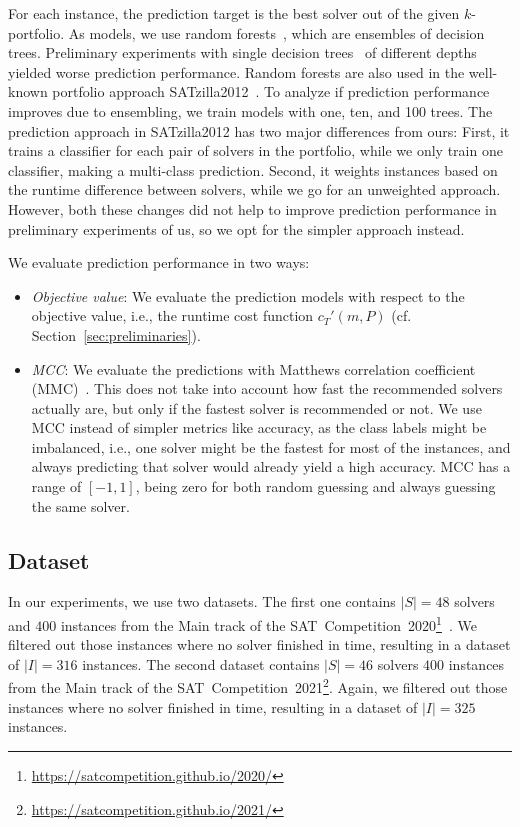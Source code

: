 \documentclass[conference]{IEEEtran}
\begin{document}
For each instance, the prediction target is the best solver out of the given $k$-portfolio.
As models, we use random forests~\cite{breiman2001random}, which are ensembles of decision trees. 
Preliminary experiments with single decision trees~\cite{breiman1984classification} of different depths yielded worse prediction performance. 
Random forests are also used in the well-known portfolio approach SATzilla2012~\cite{xu2012satzilla2012}. 
To analyze if prediction performance improves due to ensembling, we train models with one, ten, and 100 trees.
The prediction approach in SATzilla2012 has two major differences from ours:
First, it trains a classifier for each pair of solvers in the portfolio, while we only train one classifier, making a multi-class prediction.
Second, it weights instances based on the runtime difference between solvers, while we go for an unweighted approach.
However, both these changes did not help to improve prediction performance in preliminary experiments of us, so we opt for the simpler approach instead.

We evaluate prediction performance in two ways:

\begin{itemize}
	\item \emph{Objective value}:
	We evaluate the prediction models with respect to the objective value, i.e., the runtime cost function $c_{T}'(m,P)$ (cf. Section~\ref{sec:preliminaries}). 
	\item \emph{MCC}:
	We evaluate the predictions with Matthews correlation coefficient (MMC)~\cite{matthews1975comparison, gorodkin2004comparing}.
	This does not take into account how fast the recommended solvers actually are, but only if the fastest solver is recommended or not.
	We use MCC instead of simpler metrics like accuracy, as the class labels might be imbalanced, i.e., one solver might be the fastest for most of the instances, and always predicting that solver would already yield a high accuracy.
	MCC has a range of $[-1,1]$, being zero for both random guessing and always guessing the same solver.
\end{itemize}

\subsection{Dataset}

In our experiments, we use two datasets.
The first one contains $|S| = 48$ solvers and $400$ instances from the Main track of the SAT~Competition~2020\footnote{\url{https://satcompetition.github.io/2020/}}~\cite{balyo2020proceedings, SC2020:AIJ}. 
We filtered out those instances where no solver finished in time, resulting in a dataset of $|I| = 316$ instances. 
The second dataset contains $|S| = 46$ solvers $400$ instances from the Main track of the SAT~Competition~2021\footnote{\url{https://satcompetition.github.io/2021/}}.
Again, we filtered out those instances where no solver finished in time, resulting in a dataset of $|I| = 325$ instances.
\end{document}
